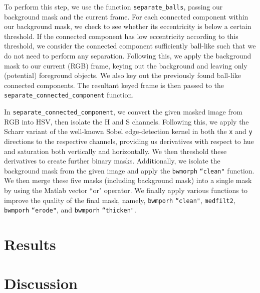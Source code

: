 \documentclass[12pt,a4paper]{article}
\begin{document}
To perform this step, we use the function \texttt{separate\_balls}, passing our background mask and the current frame. For each connected component within our background mask, we check to see whether its eccentricity is below a certain threshold. If the connected component has low eccentricity according to this threshold, we consider the connected component sufficiently ball-like such that we do not need to perform any separation. Following this, we apply the background mask to our current (RGB) frame, keying out the background and leaving only (potential) foreground objects. We also key out the previously found ball-like connected components. The resultant keyed frame is then passed to the \texttt{separate\_connected\_component} function.

In \texttt{separate\_connected\_component}, we convert the given masked image from RGB into HSV, then isolate the H and S channels. Following this, we apply the Scharr variant of the well-known Sobel edge-detection kernel in both the \texttt{x} and \texttt{y} directions to the respective channels, providing us derivatives with respect to hue and saturation both vertically and horizontally. We then threshold these derivatives to create further binary masks. Additionally, we isolate the background mask from the given image and apply the \texttt{bwmorph} \texttt{``clean"} function. We then merge these five masks (including background mask) into a single mask by using the Matlab vector ``or" operator. We finally apply various functions to improve the quality of the final mask, namely, \texttt{bwmporh} \texttt{``clean"}, \texttt{medfilt2}, \texttt{bwmporh} \texttt{``erode"}, and \texttt{bwmporh} \texttt{``thicken"}.

\section{Results}

\section{Discussion}
\end{document}
